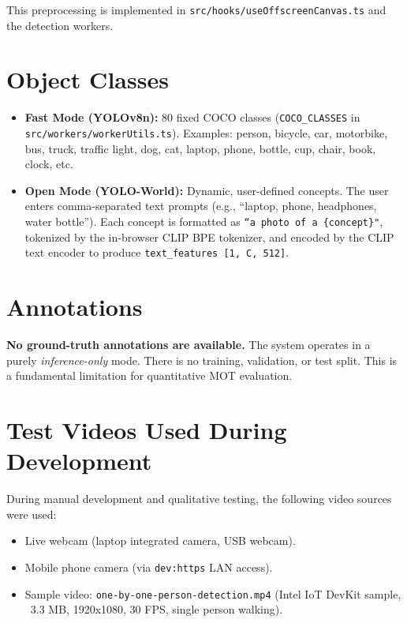 This preprocessing is implemented in \texttt{src/hooks/useOffscreenCanvas.ts} and the detection workers.

\section{Object Classes}
\label{sec:object-classes}

\begin{itemize}
    \item \textbf{Fast Mode (YOLOv8n):} 80 fixed COCO classes (\texttt{COCO\_CLASSES} in \texttt{src/workers/workerUtils.ts}). Examples: person, bicycle, car, motorbike, bus, truck, traffic light, dog, cat, laptop, phone, bottle, cup, chair, book, clock, etc.
    \item \textbf{Open Mode (YOLO-World):} Dynamic, user-defined concepts. The user enters comma-separated text prompts (e.g., ``laptop, phone, headphones, water bottle''). Each concept is formatted as \texttt{``a photo of a \{concept\}"}, tokenized by the in-browser CLIP BPE tokenizer, and encoded by the CLIP text encoder to produce \texttt{text\_features [1, C, 512]}.
\end{itemize}

\section{Annotations}
\label{sec:annotations}

\textbf{No ground-truth annotations are available.} The system operates in a purely \textit{inference-only} mode. There is no training, validation, or test split. This is a fundamental limitation for quantitative MOT evaluation.

\section{Test Videos Used During Development}
\label{sec:test-videos}

During manual development and qualitative testing, the following video sources were used:

\begin{itemize}
    \item Live webcam (laptop integrated camera, USB webcam).
    \item Mobile phone camera (via \texttt{dev:https} LAN access).
    \item Sample video: \texttt{one-by-one-person-detection.mp4} (Intel IoT DevKit sample, ~3.3 MB, 1920x1080, 30 FPS, single person walking).
\end{itemize}

